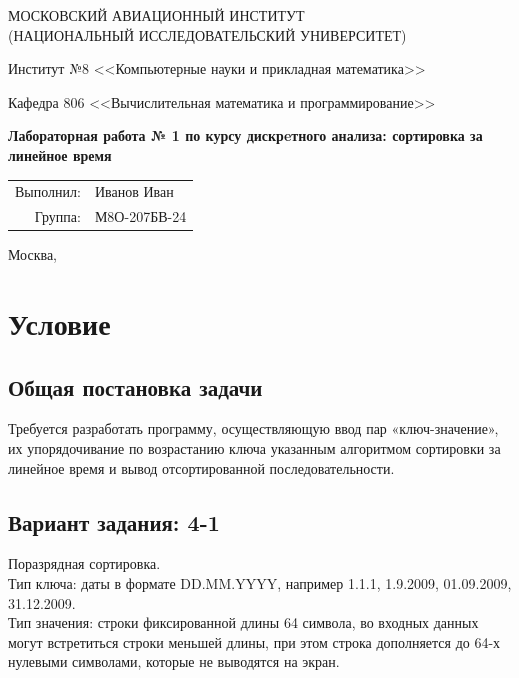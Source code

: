 \documentclass[12pt, a4paper]{article}
\begin{document}
\begin{center}
\large
МОСКОВСКИЙ АВИАЦИОННЫЙ ИНСТИТУТ\\ (НАЦИОНАЛЬНЫЙ ИССЛЕДОВАТЕЛЬСКИЙ УНИВЕРСИТЕТ)

\vspace{20pt}

Институт №8 <<Компьютерные науки и прикладная математика>>

Кафедра 806 <<Вычислительная математика и программирование>>
\end{center}

\vspace{60pt}

\begin{center}
\bfseries
\large
Лабораторная работа № 1 по курсу дискрeтного анализа: сортировка за линейное время

\vspace{54pt}

\end{center}

\vfill

\begin{flushright}
\large
\begin{tabular}{rl}
Выполнил: & Иванов Иван \\
Группа: & М8О-207БВ-24 \\
\end{tabular}
\end{flushright}

\vspace{92pt}

\begin{center}
\large
Москва, \the\year
\end{center}
\newpage

\section{Условие}

\subsection{Общая постановка задачи}
Требуется разработать программу, осуществляющую ввод пар «ключ-значение», их упорядочивание по возрастанию ключа указанным алгоритмом сортировки за линейное время и вывод отсортированной последовательности.

\subsection{Вариант задания: 4-1}
Поразрядная сортировка.\\
Тип ключа: даты в формате DD.MM.YYYY, например 1.1.1, 1.9.2009, 01.09.2009, 31.12.2009.\\
Тип значения: строки фиксированной длины 64 символа, во входных данных могут встретиться строки меньшей длины, при этом строка дополняется до 64-х нулевыми символами, которые не выводятся на экран.
\end{document}
